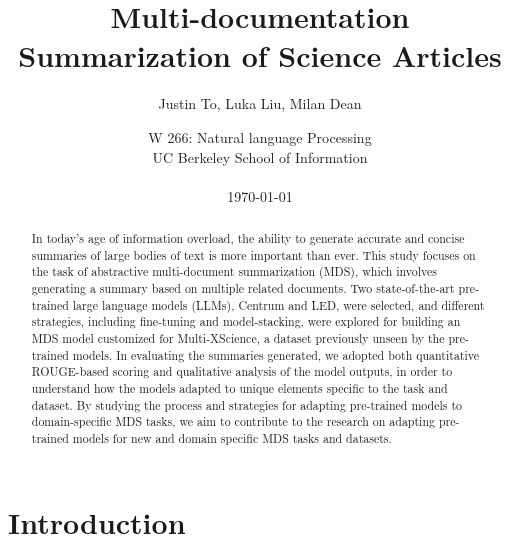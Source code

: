 \documentclass[12pt, twocolumn]{article}
\numberwithin{equation}{section}
\begin{document}
\sloppy %
\setcounter{page}{0}

\title{Multi-documentation Summarization of Science Articles}
\author{Justin To, Luka Liu, Milan Dean}
\date{
    W 266: Natural language Processing
    \\UC Berkeley School of Information
    \\~
    \\\today
}

\onecolumn

\maketitle
\begin{abstract}%

In today's age of information overload, the ability to generate accurate and concise summaries of large bodies of text is more important than ever. This study focuses on the task of abstractive multi-document summarization (MDS), which involves generating a summary based on multiple related documents. Two state-of-the-art pre-trained large language models (LLMs), Centrum and LED, were selected, and different strategies, including fine-tuning and model-stacking, were explored for building an MDS model customized for Multi-XScience, a dataset previously unseen by the pre-trained models. In evaluating the summaries generated, we adopted both quantitative ROUGE-based scoring and qualitative analysis of the model outputs, in order to understand how the models adapted to unique elements specific to the task and dataset. By studying the process and strategies for adapting pre-trained models to domain-specific MDS tasks, we aim to contribute to the research on adapting pre-trained models for new and domain specific MDS tasks and datasets.

\end{abstract}
\thispagestyle{empty}

\newpage
\twocolumn

\section{Introduction}
\end{document}
